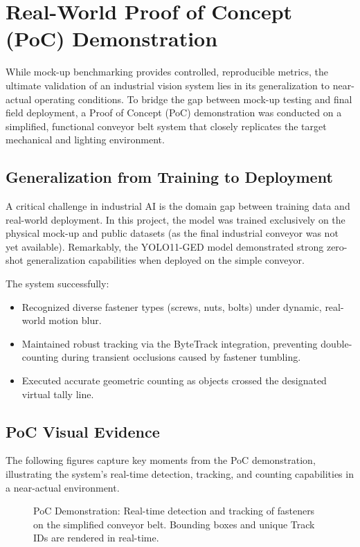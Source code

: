 \section{Real-World Proof of Concept (PoC) Demonstration}
\label{sec:poc_demo}

While mock-up benchmarking provides controlled, reproducible metrics, the ultimate validation of an industrial vision system lies in its generalization to near-actual operating conditions. To bridge the gap between mock-up testing and final field deployment, a Proof of Concept (PoC) demonstration was conducted on a simplified, functional conveyor belt system that closely replicates the target mechanical and lighting environment.

\subsection{Generalization from Training to Deployment}
A critical challenge in industrial AI is the domain gap between training data and real-world deployment. In this project, the model was trained exclusively on the physical mock-up and public datasets (as the final industrial conveyor was not yet available). Remarkably, the YOLO11-GED model demonstrated strong zero-shot generalization capabilities when deployed on the simple conveyor.

The system successfully:
\begin{itemize}
    \item Recognized diverse fastener types (screws, nuts, bolts) under dynamic, real-world motion blur.
    \item Maintained robust tracking via the ByteTrack integration, preventing double-counting during transient occlusions caused by fastener tumbling.
    \item Executed accurate geometric counting as objects crossed the designated virtual tally line.
\end{itemize}

\subsection{PoC Visual Evidence}
The following figures capture key moments from the PoC demonstration, illustrating the system's real-time detection, tracking, and counting capabilities in a near-actual environment.

\begin{figure}[htbp]
    \centering
    \caption{PoC Demonstration: Real-time detection and tracking of fasteners on the simplified conveyor belt. Bounding boxes and unique Track IDs are rendered in real-time.}
    \label{fig:poc_wide}
\end{figure}

